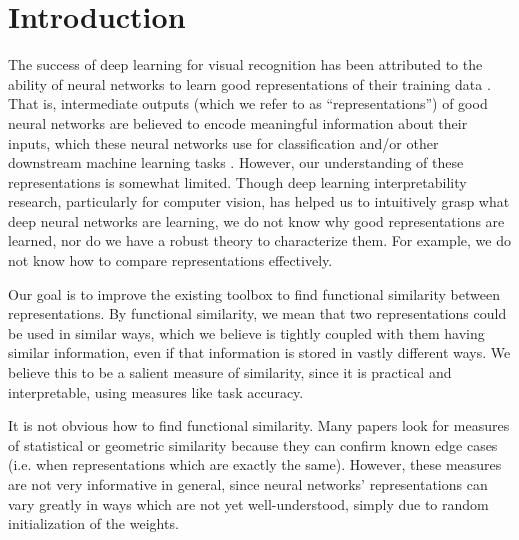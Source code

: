 \documentclass{article} %
\begin{document}
\section{Introduction}
\label{Introduction}
The success of deep learning for visual recognition has been attributed to the ability of neural networks to learn
good representations of their training data \cite{Rumelhart1986LearningIR}. That is, intermediate outputs (which we refer
to as ``representations'') of good neural networks 
are believed to encode meaningful information about their inputs, which these neural networks use for classification and/or other
downstream machine learning tasks \cite{goodfellow2016deep}.
However, our understanding of these representations is somewhat limited. Though
deep learning interpretability research, particularly for computer vision, has helped us
to intuitively grasp what deep neural 
networks are learning, we do not
know why good representations are learned, nor do we have a robust theory to characterize them. For example, we do not
know how to compare representations effectively.

Our goal is to improve the existing toolbox to find functional similarity between representations.
By functional similarity, we mean that two representations could be used in similar ways, which
we believe is tightly coupled with them having similar information, even if that information is
stored in vastly different ways. We believe this to be a salient measure of similarity, since
it is practical and interpretable, using measures like task accuracy.

It is not obvious how to find functional similarity.
Many papers \cite{Kornblith2019SimilarityON} \cite{Morcos2018InsightsOR} \cite{Ding2021GroundingRS}
look for measures of statistical or geometric similarity because they can confirm known edge cases (i.e. when
representations which are exactly the same).
However, these measures are not very informative in general, since neural networks'
representations can vary greatly in ways which are not yet well-understood,
simply due to random initialization of the weights. 
\end{document}

